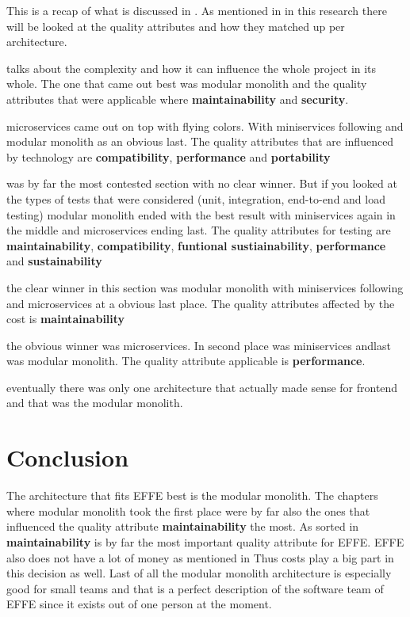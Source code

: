 This is a recap of what is discussed in . As mentioned in  in this research there will be looked at the quality attributes and how they matched up per architecture.

 talks about the complexity and how it can influence the whole project in its whole. The one that came out best was modular monolith and the quality attributes that were applicable where \textbf{maintainability} and \textbf{security}.

 microservices came out on top with flying colors. With miniservices following and modular monolith as an obvious last. The quality attributes that are influenced by technology are \textbf{compatibility}, \textbf{performance} and \textbf{portability}

 was by far the most contested section with no clear winner. But if you looked at the types of tests that were considered (unit, integration, end-to-end and load testing) modular monolith ended with the best result with miniservices again in the middle and microservices ending last. The quality attributes for testing are \textbf{maintainability}, \textbf{compatibility}, \textbf{funtional sustiainability}, \textbf{performance} and \textbf{sustainability}

 the clear winner in this section was modular monolith with miniservices following and microservices at a obvious last place. The quality attributes affected by the cost is \textbf{maintainability}

 the obvious winner was microservices. In second place was miniservices andlast was modular monolith. The quality attribute applicable is \textbf{performance}.

 eventually there was only one architecture that actually made sense for frontend and that was the modular monolith.

\section{Conclusion}

The architecture that fits EFFE best is the modular monolith. The chapters where modular monolith took the first place were by far also the ones that influenced the quality attribute \textbf{maintainability} the most. As sorted in  \textbf{maintainability} is by far the most important quality attribute for EFFE. EFFE also does not have a lot of money as mentioned in  Thus costs play a big part in this decision as well. Last of all the modular monolith architecture is especially good for small teams and that is a perfect description of the software team of EFFE since it exists out of one person at the moment.

